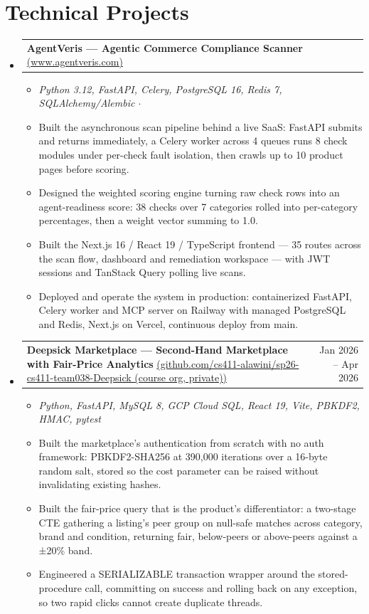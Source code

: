 \documentclass[letterpaper,11pt]{article}
\makeatletter
\newcommand{\resumeItem}[1]{
  \item\small{
    {#1 \vspace{-2pt}}
  }
}
\newcommand{\resumeProjectHeading}[2]{
    \item
    \begin{tabular*}{0.97\textwidth}{l@{\extracolsep{\fill}}r}
      \small#1 & #2 \\
    \end{tabular*}\vspace{-7pt}
}
\newcommand{\resumeSubHeadingListStart}{\begin{itemize}[leftmargin=0.15in, label={}]}
\newcommand{\resumeSubHeadingListEnd}{\end{itemize}}
\newcommand{\resumeItemListStart}{\begin{itemize}}
\newcommand{\resumeItemListEnd}{\end{itemize}\vspace{-5pt}}
\makeatother
\begin{document}
\section{Technical Projects}
  \resumeSubHeadingListStart
\resumeProjectHeading
  {\textbf{AgentVeris --- Agentic Commerce Compliance Scanner} \href{https://www.agentveris.com/}{\scriptsize(www.agentveris.com)}}{}
  \resumeItemListStart
    \resumeItem{\emph{Python 3.12, FastAPI, Celery, PostgreSQL 16, Redis 7, SQLAlchemy/Alembic $\cdot$}}
    \resumeItem{Built the asynchronous scan pipeline behind a live SaaS: FastAPI submits and returns immediately, a Celery worker across 4 queues runs 8 check modules under per-check fault isolation, then crawls up to 10 product pages before scoring.}
    \resumeItem{Designed the weighted scoring engine turning raw check rows into an agent-readiness score: 38 checks over 7 categories rolled into per-category percentages, then a weight vector summing to 1.0.}
    \resumeItem{Built the Next.js 16 / React 19 / TypeScript frontend --- 35 routes across the scan flow, dashboard and remediation workspace --- with JWT sessions and TanStack Query polling live scans.}
    \resumeItem{Deployed and operate the system in production: containerized FastAPI, Celery worker and MCP server on Railway with managed PostgreSQL and Redis, Next.js on Vercel, continuous deploy from main.}
  \resumeItemListEnd

\resumeProjectHeading
  {\textbf{Deepsick Marketplace --- Second-Hand Marketplace with Fair-Price Analytics} \href{https://github.com/cs411-alawini/sp26-cs411-team038-Deepsick (course org, private)}{\scriptsize(github.com/cs411-alawini/sp26-cs411-team038-Deepsick (course org, private))}}{Jan 2026 -- Apr 2026}
  \resumeItemListStart
    \resumeItem{\emph{Python, FastAPI, MySQL 8, GCP Cloud SQL, React 19, Vite, PBKDF2, HMAC, pytest}}
    \resumeItem{Built the marketplace's authentication from scratch with no auth framework: PBKDF2-SHA256 at 390,000 iterations over a 16-byte random salt, stored so the cost parameter can be raised without invalidating existing hashes.}
    \resumeItem{Built the fair-price query that is the product's differentiator: a two-stage CTE gathering a listing's peer group on null-safe matches across category, brand and condition, returning fair, below-peers or above-peers against a ±20\% band.}
    \resumeItem{Engineered a SERIALIZABLE transaction wrapper around the stored-procedure call, committing on success and rolling back on any exception, so two rapid clicks cannot create duplicate threads.}
  \resumeItemListEnd
  \resumeSubHeadingListEnd
\end{document}
